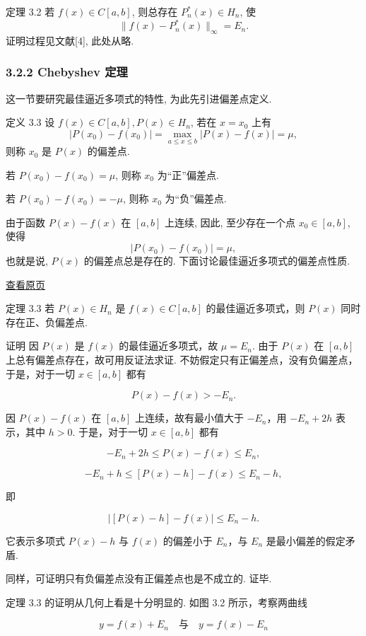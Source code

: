 \documentclass[
  10pt,
  fontset=fandol]{ctexart}
\begin{document}
定理 3.2 若 \(f(x) \in C[a,b]\), 则总存在 \(P_n^*(x) \in H_n\), 使 \[
\|f(x) - P_n^*(x)\|_\infty = E_n.
\] 证明过程见文献{[}4{]}, 此处从略.

\subsubsection{3.2.2 Chebyshev 定理}\label{chebyshev-ux5b9aux7406}

这一节要研究最佳逼近多项式的特性, 为此先引进偏差点定义.

定义 3.3 设 \(f(x) \in C[a,b], P(x) \in H_n\), 若在 \(x = x_0\) 上有 \[
|P(x_0) - f(x_0)| = \max_{a \leqslant x \leqslant b}|P(x) - f(x)| = \mu,
\] 则称 \(x_0\) 是 \(P(x)\) 的偏差点.

若 \(P(x_0) - f(x_0) = \mu\), 则称 \(x_0\) 为``正''偏差点.

若 \(P(x_0) - f(x_0) = -\mu\), 则称 \(x_0\) 为``负''偏差点.

由于函数 \(P(x) - f(x)\) 在 \([a,b]\) 上连续, 因此, 至少存在一个点 \(x_0 \in [a,b]\), 使得 \[
|P(x_0) - f(x_0)| = \mu,
\] 也就是说, \(P(x)\) 的偏差点总是存在的. 下面讨论最佳逼近多项式的偏差点性质.

\href{../../source-images/pdf-062.jpeg}{查看原页}

定理 3.3 若 \(P(x) \in H_n\) 是 \(f(x) \in C[a,b]\) 的最佳逼近多项式，则 \(P(x)\) 同时存在正、负偏差点.

证明 因 \(P(x)\) 是 \(f(x)\) 的最佳逼近多项式，故 \(\mu = E_n\). 由于 \(P(x)\) 在 \([a,b]\) 上总有偏差点存在，故可用反证法求证. 不妨假定只有正偏差点，没有负偏差点，于是，对于一切 \(x \in [a,b]\) 都有

\[
P(x) - f(x) > -E_n.
\]

因 \(P(x) - f(x)\) 在 \([a,b]\) 上连续，故有最小值大于 \(-E_n\)，用 \(-E_n + 2h\) 表示，其中 \(h > 0\). 于是，对于一切 \(x \in [a,b]\) 都有

\[
-E_n + 2h \leqslant P(x) - f(x) \leqslant E_n,
\]

\[
-E_n + h \leqslant [P(x) - h] - f(x) \leqslant E_n - h,
\]

即

\[
|[P(x) - h] - f(x)| \leqslant E_n - h.
\]

它表示多项式 \(P(x) - h\) 与 \(f(x)\) 的偏差小于 \(E_n\)，与 \(E_n\) 是最小偏差的假定矛盾.

同样，可证明只有负偏差点没有正偏差点也是不成立的. 证毕.

定理 3.3 的证明从几何上看是十分明显的. 如图 3.2 所示，考察两曲线

\[
y = f(x) + E_n \quad \text{与} \quad y = f(x) - E_n
\]
\end{document}
